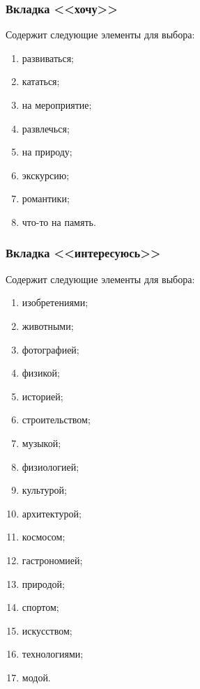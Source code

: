             \subsubsection{Вкладка <<хочу>>}
                Содержит следующие элементы для выбора: 
                \begin{enumerate}
                    \item развиваться; 
                    \item кататься; 
                    \item на мероприятие; 
                    \item развлечься; 
                    \item на природу;
                    \item экскурсию;
                    \item романтики;
                    \item что-то на память.
                \end{enumerate}
            \subsubsection{Вкладка <<интересуюсь>>}
                Содержит следующие элементы для выбора: 
                
                \begin{enumerate}
                    \item изобретениями;
                    \item животными;
                    \item фотографией;
                    \item физикой;
                    \item историей;
                    \item строительством;
                    \item музыкой;
                    \item физиологией;
                    \item культурой;
                    \item архитектурой;
                    \item космосом;
                    \item гастрономией;
                    \item природой;
                    \item спортом;
                    \item искусством;
                    \item технологиями;
                    \item модой.
                \end{enumerate}
